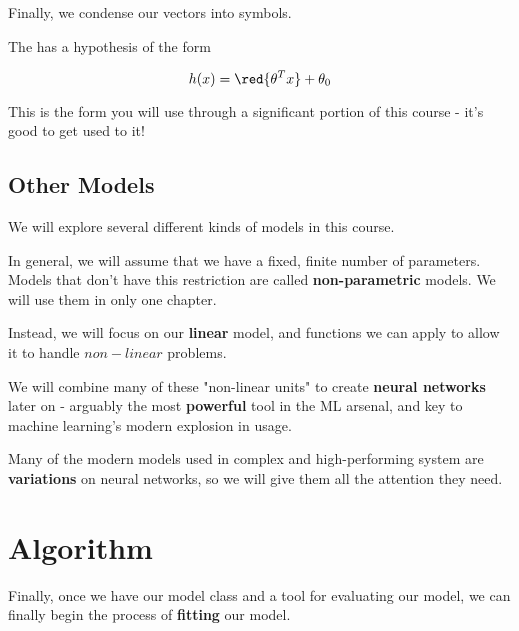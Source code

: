         Finally, we condense our vectors into symbols.\\
        
        \begin{kequation}
        
            The  has a hypothesis of the form
        
            \begin{equation}
                h(x) = \red{ \theta^T x } + \theta_0
            \end{equation}
        \end{kequation}
        
        
        This is the form you will use through a significant portion of this course - it's good to get used to it!
        
        
    \subsection{Other Models}
    
        We will explore several different kinds of models in this course.
        
        In general, we will assume that we have a fixed, finite number of parameters. Models that don't have this restriction are called \textbf{non-parametric} models. We will use them in only one chapter.
        
        Instead, we will focus on our \textbf{linear} model, and functions we can apply to allow it to handle $non-linear$ problems. 
        
        We will combine many of these "non-linear units" to create \textbf{neural networks} later on - arguably the most \textbf{powerful} tool in the ML arsenal, and key to machine learning's modern explosion in usage.
        
        Many of the modern models used in complex and high-performing system are \textbf{variations} on neural networks, so we will give them all the attention they need.

\pagebreak

\section{Algorithm}

    Finally, once we have our model class and a tool for evaluating our model, we can finally begin the process of \textbf{fitting} our model.
    
